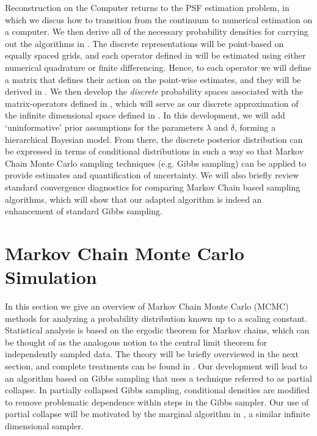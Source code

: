 \begin{chapter}{Reconstruction on the Computer}
 returns to the PSF estimation problem, in which we discus how to transition from the continuum to numerical estimation on a computer.
We then derive all of the necessary probability densities for carrying out the algorithms in .
The discrete representations will be point-based on equally spaced grids, and each operator defined in  will be estimated using either numerical quadrature or finite differencing.
Hence, to each operator we will define a matrix that defines their action on the point-wise estimates, and they will be derived in .
We then develop the \emph{discrete} probability spaces associated with the matrix-operators defined in , which will serve as our discrete approximation of the infinite dimensional space defined in .
In this development, we will add `uninformative' prior assumptions for the parameters $\lambda$ and $\delta$, forming a hierarchical Bayesian model.
From there, the discrete posterior distribution can be expressed in terms of conditional distributions in such a way so that Markov Chain Monte Carlo sampling techniques (e.g. Gibbs sampling) can be applied to provide estimates and quantification of uncertainty.
We will also briefly review standard convergence diagnostics for comparing Markov Chain based sampling algorithms, which will show that our adapted algorithm is indeed an enhancement of standard Gibbs sampling.


\section{Markov Chain Monte Carlo Simulation} \label{sec:mcmcTheory}
In this section we give an overview of Markov Chain Monte Carlo (MCMC) methods for analyzing a probability distribution known up to a scaling constant.
Statistical analysis is based on the ergodic theorem for Markov chains, which can be thought of as the analogous notion to the central limit theorem for independently sampled data. 
The theory will be briefly overviewed in the next section, and complete treatments can be found in \citep{robert2013monte}.
Our development will lead to an algorithm based on Gibbs sampling that uses a technique referred to as partial collapse.  
In partially collapsed Gibbs sampling, conditional densities are modified to remove problematic dependence within steps in the Gibbs sampler.
Our use of partial collapse will be motivated by the marginal algorithm in \citep{agapiou2014analysis}, a similar infinite dimensional sampler.


\end{chapter}
